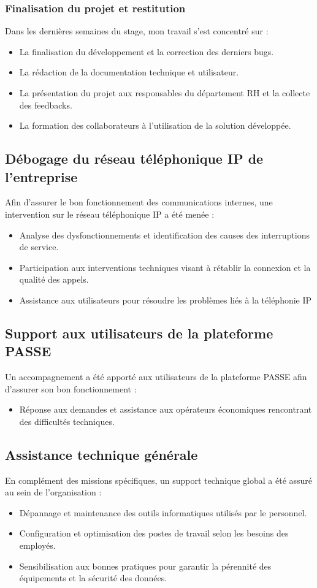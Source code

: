 \subsubsection{Finalisation du projet et restitution}
Dans les dernières semaines du stage, mon travail s'est concentré sur :

\begin{itemize}
    \item La finalisation du développement et la correction des derniers bugs.
    \item La rédaction de la documentation technique et utilisateur.
    \item La présentation du projet aux responsables du département RH et la collecte des feedbacks.
    \item La formation des collaborateurs à l'utilisation de la solution développée.

\end{itemize}
\subsection{Débogage du réseau téléphonique IP de l'entreprise}
Afin d’assurer le bon fonctionnement des communications internes, une intervention sur le réseau téléphonique IP a été menée :
\begin{itemize}
    \item Analyse des dysfonctionnements et identification des causes des interruptions de service.
    \item  Participation aux interventions techniques visant à rétablir la connexion et  la qualité des appels.
    \item Assistance aux utilisateurs pour résoudre les problèmes liés à la téléphonie IP
\end{itemize}

\subsection{Support aux utilisateurs de la plateforme PASSE}
Un accompagnement a été apporté aux utilisateurs de la plateforme PASSE afin d’assurer son bon fonctionnement :
\begin{itemize}
    \item Réponse aux demandes et assistance aux opérateurs économiques rencontrant des difficultés techniques.
\end{itemize}
\subsection{Assistance technique générale}
En complément des missions spécifiques, un support technique global a été assuré au sein de l’organisation :
\begin{itemize}
    \item Dépannage et maintenance des outils informatiques utilisés par le personnel.
    \item Configuration et optimisation des postes de travail selon les besoins des employés.
    \item Sensibilisation aux bonnes pratiques pour garantir la pérennité des équipements et la sécurité des données.
\end{itemize}
